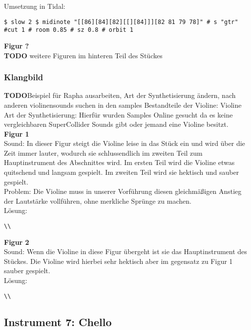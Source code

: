 \documentclass[
10pt, %
a4paper, %
oneside, %
headinclude,footinclude, %
BCOR5mm, %
]{scrartcl}
\begin{document}
\noindent Umsetzung in Tidal:
\begin{lstlisting}
$ slow 2 $ midinote "[[86][84][82][[][84]]][82 81 79 78]" # s "gtr" #cut 1 # room 0.85 # sz 0.8 # orbit 1
\end{lstlisting}

\noindent\textbf{Figur ?}\\
{\color{red}\textbf{TODO}} weitere Figuren im hinteren Teil des Stückes

\subsubsection{Klangbild}
{\color{red}\textbf{TODO}}Beispiel für Rapha ausarbeiten, Art der Synthetisierung ändern, nach anderen violinensounds suchen in den samples
Bestandteile der Violine: Violine\\
Art der Synthetisierung: Hierfür wurden Samples Online gesucht da es keine vergleichbaren SuperCollider Sounds gibt oder jemand eine Violine besitzt.\\
\noindent\textbf{Figur 1}\\
Sound: In dieser Figur steigt die Violine leise in das Stück ein und wird über die Zeit immer lauter, wodurch sie schlussendlich im zweiten Teil 
zum Hauptinstrument des Abschnittes wird. Im ersten Teil wird die Violine etwas quitschend und langsam gespielt. Im zweiten Teil wird sie hektisch und sauber gespielt.\\
Problem: Die Violine muss in unserer Vorführung diesen gleichmäßigen Anstieg der Lautstärke vollführen, ohne merkliche Sprünge zu machen.\\
Lösung:\\
\begin{lstlisting}
\\
\end{lstlisting}
\noindent\textbf{Figur 2}\\
Sound: Wenn die Violine in diese Figur übergeht ist sie das Hauptinstrument des Stückes. Die Violine wird hierbei sehr hektisch aber im gegensatz zu Figur 1 sauber gespielt.\\
Lösung:\\
\begin{lstlisting}
\\
\end{lstlisting}



\subsection{Instrument 7: Chello}
\end{document}
